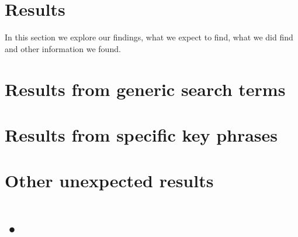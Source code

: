 \section{Results}
In this section we explore our findings, what we expect to find, what we did find and other information we found. 

\section{Results from generic search terms}


\section{Results from specific key phrases}
\section*{Other unexpected results}

\section{•}